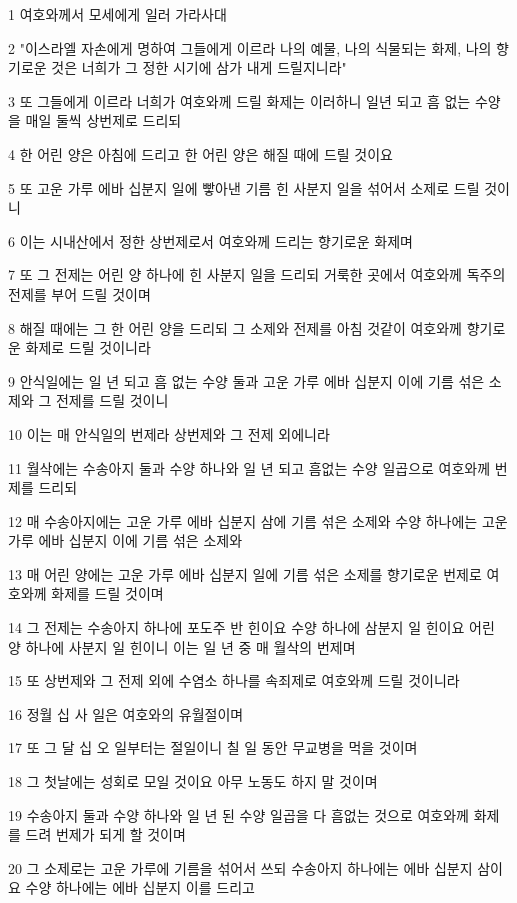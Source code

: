 \par 1 여호와께서 모세에게 일러 가라사대
\par 2 "이스라엘 자손에게 명하여 그들에게 이르라 나의 예물, 나의 식물되는 화제, 나의 향기로운 것은 너희가 그 정한 시기에 삼가 내게 드릴지니라"
\par 3 또 그들에게 이르라 너희가 여호와께 드릴 화제는 이러하니 일년 되고 흠 없는 수양을 매일 둘씩 상번제로 드리되
\par 4 한 어린 양은 아침에 드리고 한 어린 양은 해질 때에 드릴 것이요
\par 5 또 고운 가루 에바 십분지 일에 빻아낸 기름 힌 사분지 일을 섞어서 소제로 드릴 것이니
\par 6 이는 시내산에서 정한 상번제로서 여호와께 드리는 향기로운 화제며
\par 7 또 그 전제는 어린 양 하나에 힌 사분지 일을 드리되 거룩한 곳에서 여호와께 독주의 전제를 부어 드릴 것이며
\par 8 해질 때에는 그 한 어린 양을 드리되 그 소제와 전제를 아침 것같이 여호와께 향기로운 화제로 드릴 것이니라
\par 9 안식일에는 일 년 되고 흠 없는 수양 둘과 고운 가루 에바 십분지 이에 기름 섞은 소제와 그 전제를 드릴 것이니
\par 10 이는 매 안식일의 번제라 상번제와 그 전제 외에니라
\par 11 월삭에는 수송아지 둘과 수양 하나와 일 년 되고 흠없는 수양 일곱으로 여호와께 번제를 드리되
\par 12 매 수송아지에는 고운 가루 에바 십분지 삼에 기름 섞은 소제와 수양 하나에는 고운 가루 에바 십분지 이에 기름 섞은 소제와
\par 13 매 어린 양에는 고운 가루 에바 십분지 일에 기름 섞은 소제를 향기로운 번제로 여호와께 화제를 드릴 것이며
\par 14 그 전제는 수송아지 하나에 포도주 반 힌이요 수양 하나에 삼분지 일 힌이요 어린 양 하나에 사분지 일 힌이니 이는 일 년 중 매 월삭의 번제며
\par 15 또 상번제와 그 전제 외에 수염소 하나를 속죄제로 여호와께 드릴 것이니라
\par 16 정월 십 사 일은 여호와의 유월절이며
\par 17 또 그 달 십 오 일부터는 절일이니 칠 일 동안 무교병을 먹을 것이며
\par 18 그 첫날에는 성회로 모일 것이요 아무 노동도 하지 말 것이며
\par 19 수송아지 둘과 수양 하나와 일 년 된 수양 일곱을 다 흠없는 것으로 여호와께 화제를 드려 번제가 되게 할 것이며
\par 20 그 소제로는 고운 가루에 기름을 섞어서 쓰되 수송아지 하나에는 에바 십분지 삼이요 수양 하나에는 에바 십분지 이를 드리고
